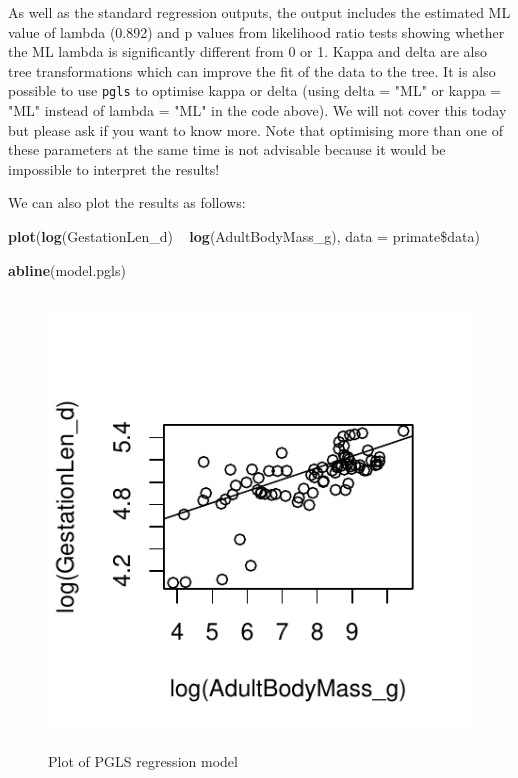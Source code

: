 \documentclass[12pt]{article}
\newcommand{\KeywordTok}[1]{\textcolor[rgb]{0.13,0.29,0.53}{\textbf{{#1}}}}
\newcommand{\DataTypeTok}[1]{\textcolor[rgb]{0.13,0.29,0.53}{{#1}}}
\newcommand{\StringTok}[1]{\textcolor[rgb]{0.31,0.60,0.02}{{#1}}}
\newcommand{\NormalTok}[1]{{#1}}
\begin{document}
As well as the standard regression outputs, the output includes the estimated ML value of lambda (0.892) and p values from likelihood ratio tests showing whether the ML lambda is significantly different from 0 or 1. Kappa and delta are also tree transformations which can improve the fit of the data to the tree. It is also possible to use \texttt{pgls} to optimise kappa or delta (using delta = "ML" or kappa = "ML" instead of lambda = "ML" in the code above). We will not cover this today but please ask if you want to know more. Note that optimising more than one of these parameters at the same time is not advisable because it would be impossible to interpret the results!

We can also plot the results as follows:

\begin{snugshade}
\begin{Highlighting}[]
\KeywordTok{plot}\NormalTok{(}\KeywordTok{log}\NormalTok{(GestationLen_d) ~}\StringTok{ }\KeywordTok{log}\NormalTok{(AdultBodyMass_g), }\DataTypeTok{data =} \NormalTok{primate\$data)}

\KeywordTok{abline}\NormalTok{(model.pgls)}
\end{Highlighting}
\end{snugshade}

\begin{figure}[H]
\centering
\includegraphics[width = 12cm, height = 12cm, keepaspectratio=true]{PGLSplot.pdf}
\caption{Plot of PGLS regression model}
\label{figure}
\end{figure}
\end{document}
